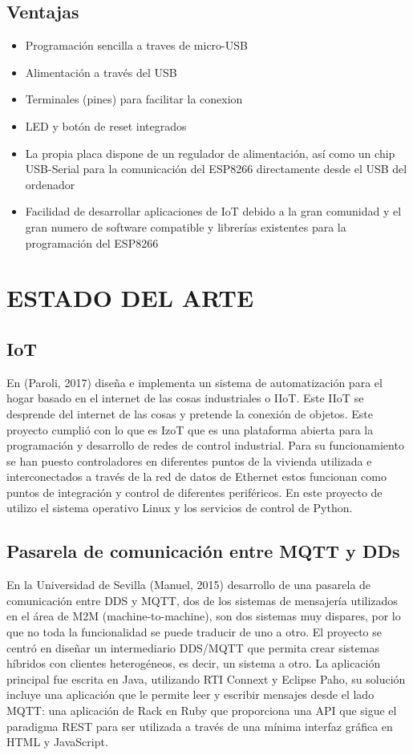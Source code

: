 \documentclass[letterpaper, 10 pt, conference]{ieeeconf}
\begin{document}
\subsection{Ventajas}

\begin{itemize}

\item Programación sencilla a traves de micro-USB
\item Alimentación a través del USB
\item Terminales (pines) para facilitar la conexion
\item LED y botón de reset integrados
\item La propia placa dispone de un regulador de alimentación, así como un chip USB-Serial para la comunicación del ESP8266 directamente desde el USB del ordenador
\item Facilidad de desarrollar aplicaciones de IoT debido a la gran comunidad y el gran numero de software compatible y librerías existentes para la programación del ESP8266

\end{itemize}

\section{ESTADO DEL ARTE}
\subsection{IoT}
En (Paroli, 2017) diseña e implementa un sistema de automatización para el hogar basado en el internet de las cosas industriales o IIoT. Este IIoT se desprende del internet de las cosas y pretende la conexión de objetos. Este proyecto cumplió con lo que es IzoT que es una plataforma abierta para la programación y desarrollo de redes de control industrial. Para su funcionamiento se han puesto controladores en diferentes puntos de la vivienda utilizada e interconectados a través de la red de datos de Ethernet estos funcionan como puntos de integración y control de diferentes periféricos. En este proyecto de utilizo el sistema operativo Linux y los servicios de control de Python.

\subsection{Pasarela de comunicación entre MQTT y DDs}
En la Universidad  de Sevilla (Manuel, 2015) desarrollo de una pasarela de comunicación entre DDS y MQTT, dos de los sistemas de mensajería utilizados en el área de M2M (machine-to-machine), son dos sistemas muy dispares, por lo que no toda la funcionalidad se puede traducir de uno a otro. El proyecto se centró en diseñar un intermediario DDS/MQTT que permita crear sistemas híbridos con clientes heterogéneos, es decir, un sistema a otro. 
La aplicación principal fue escrita en Java, utilizando RTI Connext y Eclipse Paho, su solución incluye una aplicación que le permite leer y escribir mensajes desde el lado MQTT: una aplicación de Rack en Ruby que proporciona una API que sigue el paradigma REST para ser utilizada a través de una mínima interfaz gráfica en HTML y JavaScript.
\end{document}
